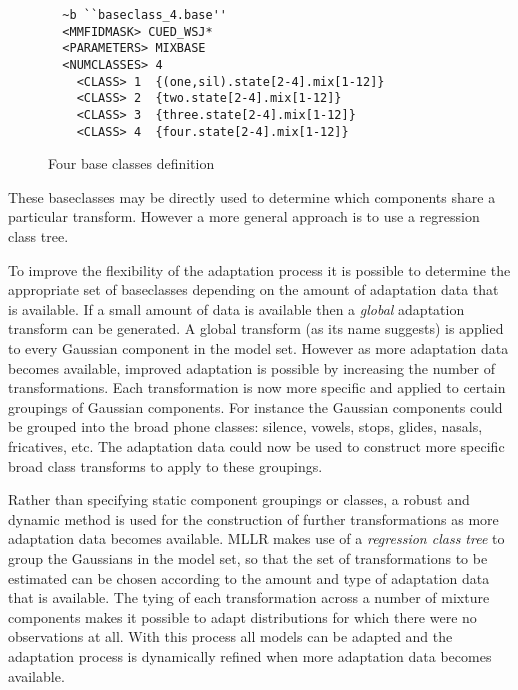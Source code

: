 \begin{figure}[htbp]
\begin{verbatim}
  ~b ``baseclass_4.base''
  <MMFIDMASK> CUED_WSJ*
  <PARAMETERS> MIXBASE
  <NUMCLASSES> 4
    <CLASS> 1  {(one,sil).state[2-4].mix[1-12]}
    <CLASS> 2  {two.state[2-4].mix[1-12]}
    <CLASS> 3  {three.state[2-4].mix[1-12]}
    <CLASS> 4  {four.state[2-4].mix[1-12]}
\end{verbatim}
\caption{Four base classes definition}
\end{figure}

These baseclasses may be directly used to determine which components
share a particular transform. However a more general approach
is to use a regression class tree.

To improve the flexibility of the adaptation process it is possible to
determine the appropriate set of baseclasses depending on the amount
of adaptation data that is available. If a small amount of data is
available then a \textit{global} adaptation transform
 can be generated. A global transform 
(as its name suggests) is applied
to every Gaussian component in the model set. However as more
adaptation data becomes available, improved adaptation is possible by
increasing the number of transformations. Each transformation is now
more specific and applied to certain groupings of Gaussian components.
For instance the Gaussian components could be grouped into the broad 
phone classes: silence, vowels, stops, glides, nasals, fricatives, etc.
The adaptation data could now be used to construct more specific broad
class transforms to apply to these groupings.

Rather than specifying static component groupings or classes, a robust
and dynamic method is used for the construction of further transformations
as more adaptation data becomes available. MLLR makes
use of a \textit{regression class tree} to group the Gaussians in the
model set, so that the set of transformations to be estimated can be
chosen according to the amount and type of adaptation data that is
available. The tying of each transformation across a number of mixture
components makes it possible to adapt distributions for which there
were no observations at all. With this process all models can be
adapted and the adaptation process is dynamically refined when more
adaptation data becomes available.\\

